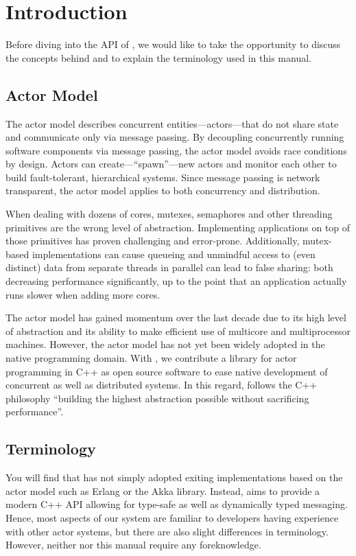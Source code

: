 \section{Introduction}

Before diving into the API of \lib, we would like to take the opportunity to discuss the concepts behind \lib and to explain the terminology used in this manual.

\subsection{Actor Model}

The actor model describes concurrent entities---actors---that do not share state and communicate only via message passing.
By decoupling concurrently running software components via message passing, the actor model avoids race conditions by design.
Actors can create---``spawn''---new actors and monitor each other to build fault-tolerant, hierarchical systems.
Since message passing is network transparent, the actor model applies to both concurrency and distribution.

When dealing with dozens of cores, mutexes, semaphores and other threading primitives are the wrong level of abstraction.
Implementing applications on top of those primitives has proven challenging and error-prone.
Additionally, mutex-based implementations can cause queueing and unmindful access to (even distinct) data from separate threads in parallel can lead to false sharing: both decreasing performance significantly, up to the point that an application actually runs slower when adding more cores.

The actor model has gained momentum over the last decade due to its high level of abstraction and its ability to make efficient use of multicore and multiprocessor machines.
However, the actor model has not yet been widely adopted in the native programming domain.
With \lib, we contribute a library for actor programming in C++ as open source software to ease native development of concurrent as well as distributed systems.
In this regard, \lib follows the C++ philosophy ``building the highest abstraction possible without sacrificing performance''.

\subsection{Terminology}

You will find that \lib has not simply adopted exiting implementations based on the actor model such as Erlang or the Akka library.
Instead, \lib aims to provide a modern C++ API allowing for type-safe as well as dynamically typed messaging.
Hence, most aspects of our system are familiar to developers having experience with other actor systems, but there are also slight differences in terminology.
However, neither \lib nor this manual require any foreknowledge.

